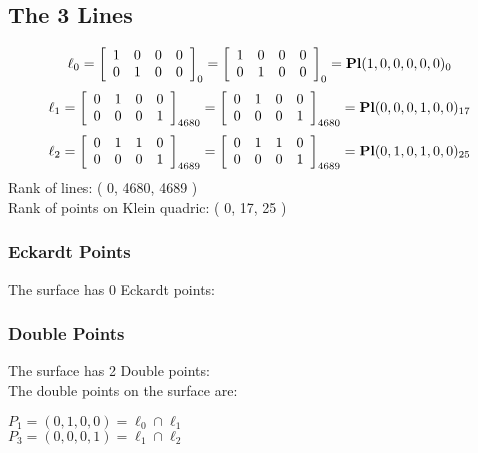 \documentclass{article}
\begin{document}
{\subsection*{The 3 Lines}
$$
\ell_{0} = 
\left[
\begin{array}{*{4}{r}}
1 & 0 & 0 & 0\\
0 & 1 & 0 & 0\\
\end{array}
\right]
_{0}
=
\left[
\begin{array}{*{4}c}
1  & 0  & 0  & 0\\
0  & 1  & 0  & 0\\
\end{array}
\right]_{0}
={\rm\bf Pl}(1,0,0,0,0,0 )_{0}$$
$$
\ell_{1} = 
\left[
\begin{array}{*{4}{r}}
0 & 1 & 0 & 0\\
0 & 0 & 0 & 1\\
\end{array}
\right]
_{4680}
=
\left[
\begin{array}{*{4}c}
0  & 1  & 0  & 0\\
0  & 0  & 0  & 1\\
\end{array}
\right]_{4680}
={\rm\bf Pl}(0,0,0,1,0,0 )_{17}$$
$$
\ell_{2} = 
\left[
\begin{array}{*{4}{r}}
0 & 1 & 1 & 0\\
0 & 0 & 0 & 1\\
\end{array}
\right]
_{4689}
=
\left[
\begin{array}{*{4}c}
0  & 1  & 1  & 0\\
0  & 0  & 0  & 1\\
\end{array}
\right]_{4689}
={\rm\bf Pl}(0,1,0,1,0,0 )_{25}$$
Rank of lines: ( 0, 4680, 4689 )\\
Rank of points on Klein quadric: ( 0, 17, 25 )\\
\subsubsection*{Eckardt Points}
The surface has 0 Eckardt points:\\
\subsubsection*{Double Points}
The surface has 2 Double points:\\
The double points on the surface are:\\
\begin{multicols}{2}
\noindent
$P_{1} = ( 0, 1, 0, 0 ) = \ell_{0} \cap \ell_{1} $\\
$P_{3} = ( 0, 0, 0, 1 ) = \ell_{1} \cap \ell_{2} $\\
\end{multicols}
}
\end{document}
